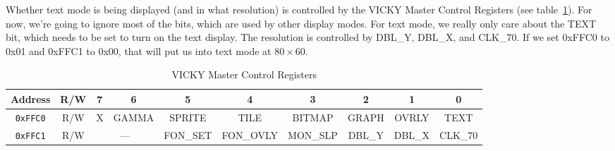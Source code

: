 Whether text mode is being displayed (and in what resolution) is controlled by the VICKY Master Control Registers (see table~\ref{tab:vky_master_ctrl_reg}). For now, we're going to ignore most of the bits, which are used by other display modes. For text mode, we really only care about the TEXT bit, which needs to be set to turn on the text display. The resolution is controlled by DBL\_Y, DBL\_X, and CLK\_70. If we set 0xFFC0 to 0x01 and 0xFFC1 to 0x00, that will put us into text mode at $80 \times 60$.

\begin{table}[ht]
    \begin{center}
        \begin{tabular}{|c|c|c|c|c|c|c|c|c|c|} \hline
            Address & R/W & 7 & 6 & 5 & 4 & 3 & 2 & 1 & 0 \\ \hline\hline
            \verb+0xFFC0+ & R/W & X & GAMMA & SPRITE & TILE & BITMAP & GRAPH & OVRLY & TEXT \\ \hline
            \verb+0xFFC1+ & R/W & \multicolumn{2}{|c|}{---} & FON\_SET & FON\_OVLY & MON\_SLP & DBL\_Y & DBL\_X & CLK\_70 \\ \hline
        \end{tabular}
    \end{center}
    \caption{VICKY Master Control Registers}
    \label{tab:vky_master_ctrl_reg}
\end{table}

